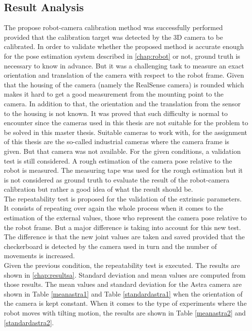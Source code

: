 \subsection{Result Analysis}

The propose robot-camera calibration method was successfully performed provided that the calibration target was detected by the 3D camera to be calibrated. In order to validate whether the proposed method is accurate enough for the pose estimation system described in \ref{chap:robot} or not, ground truth is necessary to know in advance. But it was a challenging task to measure an exact orientation and translation of the camera with respect to the robot frame. Given that the housing of the camera (namely the RealSense camera) is rounded which makes it hard to get a good measurement from the mounting point to the camera. In addition to that, the orientation and the translation from the sensor to the housing is not known. It was proved that such difficulty is normal to encounter since the cameras used in this thesis are not suitable for the problem to be solved in this master thesis. Suitable cameras to work with, for the assignment of this thesis are the so-called industrial cameras where the camera frame is given. But that camera was not available.  
For the given conditions, a validation test is still considered. A rough estimation of the camera pose relative to the robot is measured. The measuring tape was used for the rough estimation but it is not considered as ground truth to evaluate the result of the robot-camera calibration but rather a good idea of what the result should be. \\
The repeatability test is proposed for the validation of the extrinsic parameters. It consists of repeating over again the whole process when it comes to the estimation of the external values, those who represent the camera pose relative to the robot frame. But a major difference is taking into account for this new test. The difference is that the new joint values are taken and saved provided that the checkerboard is detected by the camera used in turn and the number of movements is increased.\\
Given the previous condition, the repeatability test is executed. The results are shown in \ref{chap:resultsa}. Standard deviation and mean values are computed from those results. The mean values and standard deviation for the Astra camera are shown in Table \ref{meanastra1} and Table \ref{standardastra1} when the orientation of the camera is kept constant. When it comes to the type of experiments where the robot moves with tilting motion, the results are shown in Table \ref{meanastra2} and \ref{standardastra2}.\\
